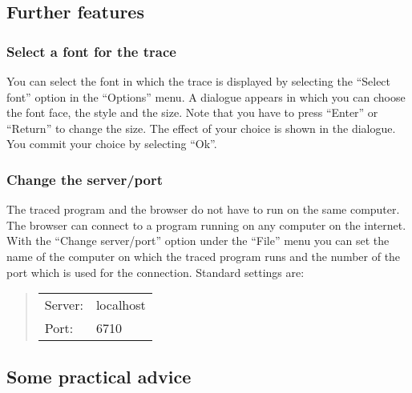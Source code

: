 \documentclass[12pt]{article}
\begin{document}

\subsection{Further features}

\subsubsection{Select a font for the trace}

You can select the font in which the trace is displayed by selecting the ``Select font'' option in the ``Options'' menu. A dialogue appears in which you can choose the font face, the style and the size. Note that you have to press ``Enter'' or ``Return'' to change the size. The effect of your choice is shown in the dialogue. You commit your choice by selecting ``Ok''.

\subsubsection{Change the server/port}

The traced program and the browser do not have to run on the same computer.
The browser can connect to a program running on any computer on the internet.
With the ``Change server/port'' option under the ``File'' menu you can set the name of the computer on which the traced program runs and the number of the port which is used for the connection. Standard settings are:
\begin{quote}
\begin{tabular}{ll}
Server: & localhost \\
Port: & 6710 \\
\end{tabular}
\end{quote}


\subsection{Some practical advice}
\end{document}
